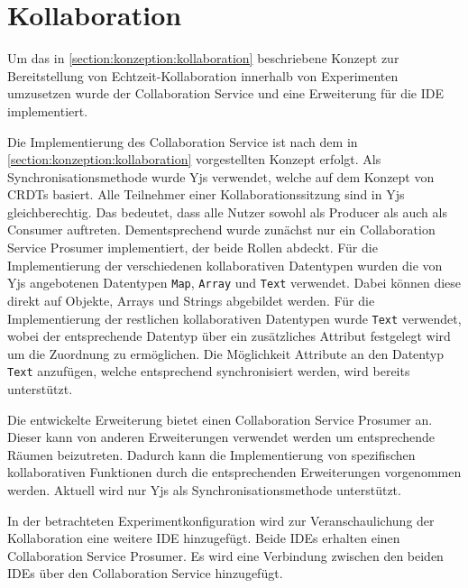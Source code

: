 \section{Kollaboration}\label{section:prototypische-implementierung:kollaboration}


Um das in \autoref{section:konzeption:kollaboration} beschriebene Konzept zur Bereitstellung von Echtzeit-Kollaboration innerhalb von Experimenten umzusetzen wurde der Collaboration Service und eine Erweiterung für die IDE implementiert.

Die Implementierung des Collaboration Service ist nach dem in \autoref{section:konzeption:kollaboration} vorgestellten Konzept erfolgt. Als Synchronisationsmethode wurde Yjs \cite{noauthor_yjs_nodate} verwendet, welche auf dem Konzept von \acp{CRDT} basiert. Alle Teilnehmer einer Kollaborationssitzung sind in Yjs gleichberechtig. Das bedeutet, dass alle Nutzer sowohl als Producer als auch als Consumer auftreten. Dementsprechend wurde zunächst nur ein Collaboration Service Prosumer implementiert, der beide Rollen abdeckt. Für die Implementierung der verschiedenen kollaborativen Datentypen wurden die von Yjs angebotenen Datentypen \texttt{Map}, \texttt{Array} und \texttt{Text} verwendet. Dabei können diese direkt auf Objekte, Arrays und Strings abgebildet werden. Für die Implementierung der restlichen kollaborativen Datentypen wurde \texttt{Text} verwendet, wobei der entsprechende Datentyp über ein zusätzliches Attribut festgelegt wird um die Zuordnung zu ermöglichen. Die Möglichkeit Attribute an den Datentyp \texttt{Text} anzufügen, welche entsprechend synchronisiert werden, wird bereits unterstützt.

Die entwickelte Erweiterung bietet einen Collaboration Service Prosumer an. Dieser kann von anderen Erweiterungen verwendet werden um entsprechende Räumen beizutreten. Dadurch kann die Implementierung von spezifischen kollaborativen Funktionen durch die entsprechenden Erweiterungen vorgenommen werden. Aktuell wird nur Yjs als Synchronisationsmethode unterstützt.

In der betrachteten Experimentkonfiguration wird zur Veranschaulichung der Kollaboration eine weitere IDE hinzugefügt. Beide IDEs erhalten einen Collaboration Service Prosumer. Es wird eine Verbindung zwischen den beiden IDEs über den Collaboration Service hinzugefügt.